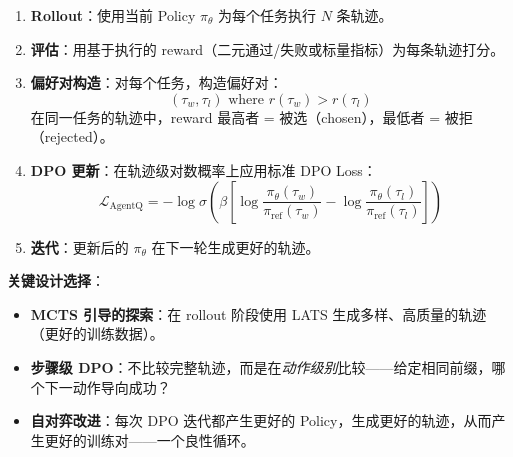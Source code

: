 \begin{enumerate}
  \item \textbf{Rollout}：使用当前 Policy $\pi_\theta$ 为每个任务执行 $N$ 条轨迹。
  \item \textbf{评估}：用基于执行的 reward（二元通过/失败或标量指标）为每条轨迹打分。
  \item \textbf{偏好对构造}：对每个任务，构造偏好对：
\begin{equation}
(\tau_w, \tau_l) \text{ where } r(\tau_w) > r(\tau_l)
\end{equation}
 在同一任务的轨迹中，reward 最高者 = 被选（chosen），最低者 = 被拒（rejected）。
  \item \textbf{DPO 更新}：在轨迹级对数概率上应用标准 DPO Loss：
\begin{equation}
\mathcal{L}_{\text{AgentQ}} = -\log \sigma\!\left(\beta \left[\log\frac{\pi_\theta(\tau_w)}{\pi_{\text{ref}}(\tau_w)} - \log\frac{\pi_\theta(\tau_l)}{\pi_{\text{ref}}(\tau_l)}\right]\right)
\end{equation}
  \item \textbf{迭代}：更新后的 $\pi_\theta$ 在下一轮生成更好的轨迹。
\end{enumerate}

\textbf{关键设计选择}：

\begin{itemize}
  \item \textbf{MCTS 引导的探索}：在 rollout 阶段使用 LATS 生成多样、高质量的轨迹（更好的训练数据）。
  \item \textbf{步骤级 DPO}：不比较完整轨迹，而是在\emph{动作级别}比较——给定相同前缀，哪个下一动作导向成功？
  \item \textbf{自对弈改进}：每次 DPO 迭代都产生更好的 Policy，生成更好的轨迹，从而产生更好的训练对——一个良性循环。
\end{itemize}


